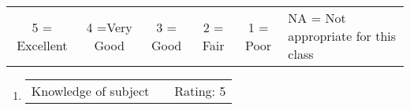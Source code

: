 \documentclass[11pt,dvipsnames]{article}
\begin{document}

{\tabulinesep=1.2mm
	\begin{tabu}{c  c c c c p{4cm} }
		
		5 = Excellent   & 4 =Very Good & 3 = Good & 2 = Fair & 1 = Poor & NA = Not appropriate for this class  \\ 	
	\end{tabu}}
\vskip 0.5cm

\begin{enumerate}[label= {\bf  \arabic*:}]
	\item
	\begin{tabular}[t]{p{} p{2cm} p{2cm} }
		Knowledge of subject &  & Rating: 5 \\
	\end{tabular} 
	

\end{enumerate}
\end{document}
